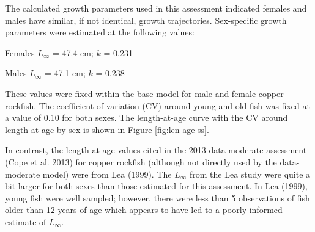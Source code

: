 \documentclass[11pt,
  english,
  a4paper,
]{article}
\begin{document}
\leavevmode\tagmcend\tagstructend\par


The calculated growth parameters used in this assessment indicated females and males have similar, if not identical, growth trajectories. Sex-specific growth parameters were estimated at the following values:

\leavevmode\tagmcend\tagstructend\par

\begin{centering}

Females $L_{\infty}$ = 47.4 cm; $k$ = 0.231

Males $L_{\infty}$ = 47.1 cm; $k$ = 0.238

\end{centering}

\vspace{0.75cm}


These values were fixed within the base model for male and female copper rockfish. The coefficient of variation (CV) around young and old fish was fixed at a value of 0.10 for both sexes. The length-at-age curve with the CV around length-at-age by sex is shown in Figure \ref{fig:len-age-ss}.

\leavevmode\tagmcend\tagstructend\par


In contrast, the length-at-age values cited in the 2013 data-moderate assessment {(Cope et al. 2013)\leavevmode\tagmcend\tagstructend} for copper rockfish (although not directly used by the data-moderate model) were from Lea {(1999)\leavevmode\tagmcend\tagstructend}. The {\(L_{\infty}\)\leavevmode\tagmcend\tagstructend} from the Lea study were quite a bit larger for both sexes than those estimated for this assessment. In Lea {(1999)\leavevmode\tagmcend\tagstructend}, young fish were well sampled; however, there were less than 5 observations of fish older than 12 years of age which appears to have led to a poorly informed estimate of {\(L_{\infty}\)\leavevmode\tagmcend\tagstructend}.
\end{document}
